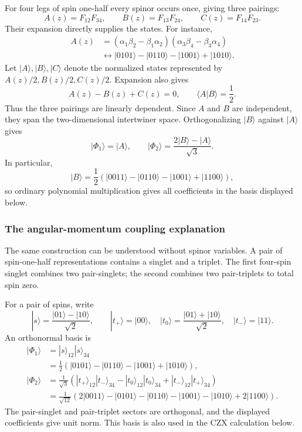 For four legs of spin one-half every spinor occurs once, giving three
pairings:
\begin{equation}
 A(z)=F_{12}F_{34},\qquad B(z)=F_{13}F_{24},\qquad C(z)=F_{14}F_{23}.
\end{equation}
Their expansion directly supplies the states. For instance,
\begin{align}
 A(z)&=(\alpha_1\beta_2-\beta_1\alpha_2)
       (\alpha_3\beta_4-\beta_3\alpha_4)\nonumber\\
 &\longleftrightarrow |0101\rangle-|0110\rangle-|1001\rangle+|1010\rangle.
\end{align}
Let $|A\rangle,|B\rangle,|C\rangle$ denote the normalized states represented
by $A(z)/2,B(z)/2,C(z)/2$. Expansion also gives
\begin{equation}
 A(z)-B(z)+C(z)=0,\qquad
 \langle A|B\rangle=\frac12.
\end{equation}
Thus the three pairings are linearly dependent. Since $A$ and $B$ are
independent, they span the two-dimensional intertwiner space. Orthogonalizing
$|B\rangle$ against $|A\rangle$ gives
\begin{equation}
 |\Phi_1\rangle=|A\rangle,\qquad
 |\Phi_2\rangle=\frac{2|B\rangle-|A\rangle}{\sqrt3}.
\end{equation}
In particular,
\begin{equation}
 |B\rangle=\frac12
 (|0011\rangle-|0110\rangle-|1001\rangle+|1100\rangle),
\end{equation}
so ordinary polynomial multiplication gives all coefficients in the
basis displayed below.

\subsubsection{The angular-momentum coupling explanation}

The same construction can be understood without spinor variables.
A pair of spin-one-half representations contains a singlet and a triplet.
The first four-spin singlet combines two pair-singlets; the second combines
two pair-triplets to total spin zero.

For a pair of spins, write
\begin{equation}
 |s\rangle=\frac{|01\rangle-|10\rangle}{\sqrt2},\qquad
 |t_+\rangle=|00\rangle,\quad
 |t_0\rangle=\frac{|01\rangle+|10\rangle}{\sqrt2},\quad
 |t_-\rangle=|11\rangle.
\end{equation}
An orthonormal basis is
\begin{align}
 |\Phi_1\rangle&=|s\rangle_{12}|s\rangle_{34}\nonumber\\
 &=\frac12(|0101\rangle-|0110\rangle-|1001\rangle+|1010\rangle),
 \label{eqn:Phi1}\\
 |\Phi_2\rangle&=\frac1{\sqrt3}
 (|t_+\rangle_{12}|t_-\rangle_{34}
 -|t_0\rangle_{12}|t_0\rangle_{34}
 +|t_-\rangle_{12}|t_+\rangle_{34})\nonumber\\
 &=\frac1{\sqrt{12}}
 (2|0011\rangle-|0101\rangle-|0110\rangle-|1001\rangle
 -|1010\rangle+2|1100\rangle).
 \label{eqn:Phi2}
\end{align}
The pair-singlet and pair-triplet sectors are orthogonal, and the displayed
coefficients give unit norm. This basis is also used in the CZX calculation below.

